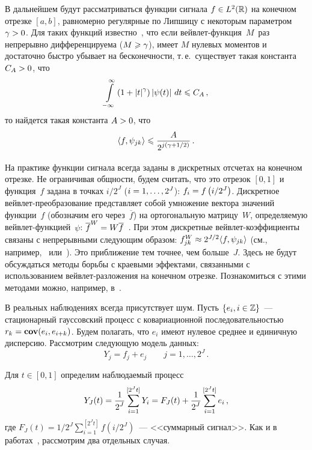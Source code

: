 \begin{multicols}{2}
В дальнейшем будут рассматриваться функции сигнала $f\hm\in L^2(\mathbb{R})$ 
на конечном отрезке $[a,b]$, равномерно регулярные по Липшицу с некоторым 
параметром $\gamma\hm>0$. Для таких функций известно~\cite{14-she}, 
что если вейв\-лет-функ\-ция~$M$~раз непрерывно дифференцируема 
($M\hm\geqslant\gamma$), имеет $M$ нулевых моментов и достаточно 
быстро убывает на бесконечности, т.\,е.\ существует такая константа $C_A\hm>0$, что
$$
\int\limits_{-\infty}^{\infty}\left(1+\left\vert t\right\vert^{\gamma}\right)\left\vert\psi(t)\right\vert\,dt\leqslant C_A\,,
$$
то найдется такая константа $A\hm>0$, что
\begin{equation}
\langle f,\psi_{jk}\rangle\leqslant\displaystyle\frac{\displaystyle A\mathstrut}{\displaystyle 2^{j\left(\gamma+1/2\right)}\mathstrut}\,.
\label{Coeff_Decay}
\end{equation}

На практике функции сигнала всегда заданы в дискретных отсчетах на конечном отрезке. 
Не ограничивая общности, будем считать, что это отрезок $[0,1]$ и функция~$f$ задана в 
точках $i/2^J$ ($i\hm=1,\ldots, 2^J$): $f_i\hm=f\left(i/2^J\right)$.
Дискретное вейв\-лет-пре\-обра\-зо\-ва\-ние представляет собой умножение 
вектора значений функции~$f$ (обозначим его через~$\overline{f}$) на ортогональную матрицу~$W$, 
определяемую вейв\-лет-функ\-ци\-ей~$\psi$: $\overline{f}^{W}\hm=W\overline{f}$~\cite{14-she}. 
При этом дискретные вейв\-лет-ко\-эф\-фи\-ци\-ен\-ты связаны с непрерывными следующим образом: 
$f^{W}_{jk}\hm\approx 2^{J/2}\langle f,\psi_{jk}\rangle$ (см., например,~\cite{2-she} 
или~\cite{14-she}). Это приближение тем точнее, чем больше~$J$. 
Здесь не будут обсуждаться методы борьбы с краевыми эффектами, 
связанными с использованием вейв\-лет-раз\-ло\-же\-ния на конечном отрезке. 
Познакомиться с этими методами можно, например, в~\cite{15-she}.

В реальных наблюдениях всегда присутствует шум. Пусть $\{e_i, i \hm\in \mathbb{Z}\}$~--- 
стационарный гауссовский процесс с ковариационной по\-сле\-до\-ва\-тель\-ностью 
$r_k \hm= \cov (e_i,e_{i+k})$. Будем полагать, что $e_i$ имеют нулевое среднее и 
единичную дисперсию. Рас\-смот\-рим следующую модель данных:
\begin{equation*}
Y_j = f_j + e_j \qquad j = 1, \dots, 2^J\,.
\end{equation*}

Для $t\in [0,1]$ определим наблюдаемый процесс
\begin{equation*}
Y_J(t) = \displaystyle\frac{\displaystyle 1\mathstrut}{\displaystyle 2^J\mathstrut} \sum\limits_{i=1}^{[2^Jt]} Y_i = 
F_J(t)+ \displaystyle\frac{\displaystyle 1\mathstrut}{\displaystyle 2^J\mathstrut} \sum\limits_{i=1}^{[2^Jt]} e_i\,,
\end{equation*}
где $F_J(t)=1/2^J \sum\limits_{i=1}^{[2^Jt]} f(i/2^J)$~--- 
<<суммарный сигнал>>. Как и в работах~\cite{16-she, 17-she}, рассмотрим два от\-дель\-ных случая.


\end{multicols}
